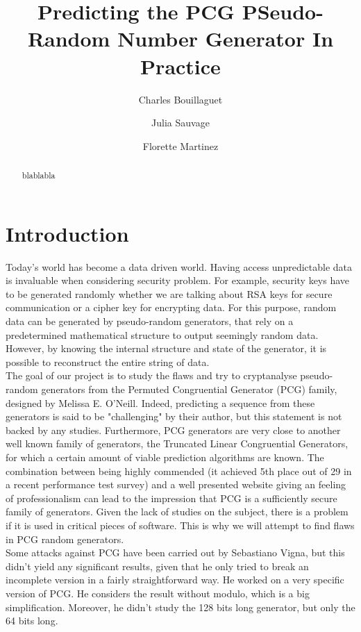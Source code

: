 \documentclass[preprint]{iacrtrans}
\title{Predicting the PCG PSeudo-Random Number Generator In Practice}
\author{Charles Bouillaguet\inst{1} \and Julia Sauvage\inst{2} \and Florette Martinez\inst{3}}
\institute{%
University of Lille, France \\ 
\email{charles.bouillaguet@univ-lille.fr}
\and 
Sorbonne University \\
\email{julia.sauvage@etu.upmc.fr}
\and 
LIP6, CNRS, SU ? \\
\email{florette.martinez@lip6.fr}

}
\begin{document}
\maketitle


\begin{abstract}
  blablabla
\end{abstract}

\section{Introduction} %

Today's world has become a data driven world. Having access unpredictable data is invaluable when considering security problem. For example, security keys have to be generated randomly whether we are talking about RSA keys for secure communication or a cipher key for encrypting data. For this purpose, random data can be generated by pseudo-random generators, that rely on a predetermined mathematical structure to output seemingly random data. However, by knowing the internal structure and state of the generator, it is possible to reconstruct the entire string of data.\\

The goal of our project is to study the flaws and try to cryptanalyse pseudo-random generators from the Permuted Congruential Generator (PCG) family, designed by Melissa E. O'Neill.\cite{melissapaper} Indeed, predicting a sequence from these generators is said to be "challenging"\cite{melissaweb} by their author, but this statement is not backed by any studies. Furthermore, PCG generators are very close to another well known family of generators, the Truncated Linear Congruential Generators, for which a certain amount of viable prediction algorithms are known. The combination between being highly commended (it achieved 5th place out of 29 in a recent performance test survey\cite{survey}) and a well presented website\cite{melissaweb} giving an feeling of professionalism can lead to the impression that PCG is a sufficiently secure family of generators. Given the lack of studies on the subject, there is a problem if it is used in critical pieces of software. This is why we will attempt to find flaws in PCG random generators.\\

Some attacks against PCG have been carried out by Sebastiano Vigna\cite{vignaweb}, but this didn't yield any significant results, given that he only tried to break an incomplete version in a fairly straightforward way. He worked on a very specific version of PCG. He considers the result without modulo, which is a big simplification. Moreover, he didn't study the 128 bits long generator, but only the 64 bits long\cite{vignacode}.\\
\end{document}
